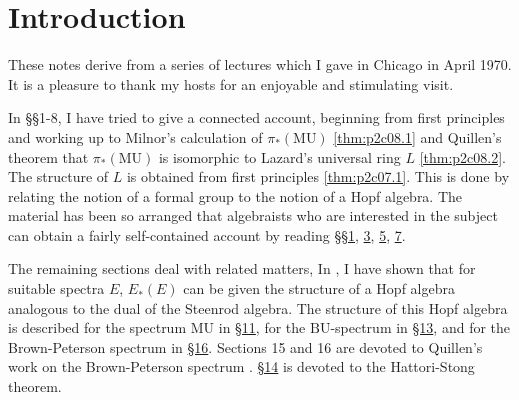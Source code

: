 \documentclass[../main]{subfiles}
\begin{document}
\chapter{Introduction}
\label{sec:p2c0}


These notes derive from a series of lectures which I gave in Chicago in April 1970. It is a pleasure to thank my hosts for an enjoyable and stimulating visit.

In \S\S1-8, I have tried to give a connected account, beginning from first principles and working up to Milnor's calculation of $\pi_\ast(\mathrm{MU})$ \eqref{thm:p2c08.1} and Quillen's theorem that $\pi_\ast(\mathrm{MU})$ is isomorphic to Lazard's universal ring $L$ \eqref{thm:p2c08.2}. The structure of $L$ is obtained from first principles \eqref{thm:p2c07.1}. This is done by relating the notion of a formal group to the notion of a Hopf algebra. The material has been so arranged that algebraists who are interested in the subject can obtain a fairly self-contained account by reading \S\S\hyperref[sec:p2c1]{1}, \hyperref[sec:p2c3]{3}, \hyperref[sec:p2c5]{5}, \hyperref[sec:p2c7]{7}.

The remaining sections deal with related matters, In \cite[Lecture 3]{adams3}, I have shown that for suitable spectra $E$, $E_\ast(E)$ can be given the structure of a Hopf algebra analogous to the dual of the Steenrod algebra. The structure of this Hopf algebra is described for the spectrum $\mathrm{MU}$ in \hyperref[sec:p2c11]{\S 11}, for the $\mathrm{BU}$-spectrum in \hyperref[sec:p2c13]{\S 13}, and for the Brown-Peterson spectrum in \hyperref[sec:p2c16]{\S 16}. Sections 15 and 16 are devoted to Quillen's work on the Brown-Peterson spectrum \cite{quillen}. \hyperref[sec:p2c14]{\S 14} is devoted to the Hattori-Stong theorem.
\end{document}
